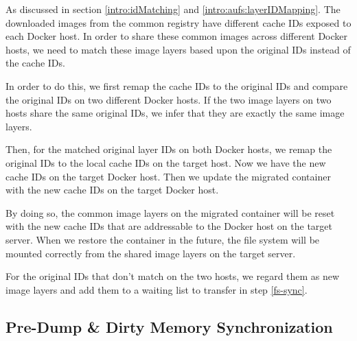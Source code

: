 As discussed in section \ref{intro:idMatching} and \ref{intro:aufs:layerIDMapping}. The downloaded images from the common registry have different cache IDs exposed to each Docker host. In order to share these common images across different Docker hosts, we need to match these image layers based upon the original IDs instead of the cache IDs.

In order to do this, we first remap the cache IDs to the original IDs and compare the original IDs on two different Docker hosts. If the two image layers on two hosts share the same original IDs, we infer that they are exactly the same image layers. 

Then, for the matched original layer IDs on both Docker hosts, we remap the original IDs to the local cache IDs on the target host. Now we have the new cache IDs on the target Docker host. Then we update the migrated container with the new cache IDs on the target Docker host. 

By doing so, the common image layers on the migrated container will be reset with the new cache IDs that are addressable to the Docker host on the target server. When we restore the container in the future, the file system will be mounted correctly from the shared image layers on the target server.

 For the original IDs that don't match on the two hosts, we regard them as new image layers and add them to a waiting list to transfer in step \ref{fs-sync}.







\subsection{Pre-Dump \& Dirty Memory Synchronization} \label{design:memDiff}

